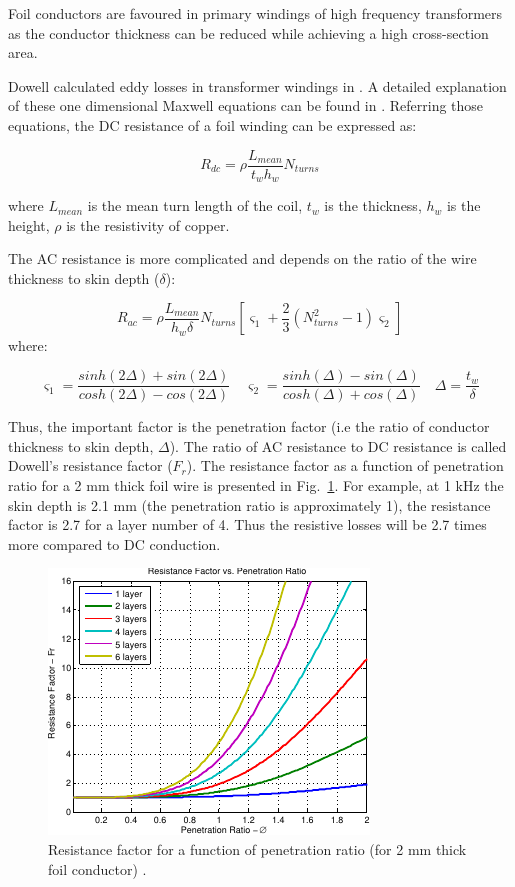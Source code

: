 \documentclass[a4paper, 11pt]{article} %
\begin{document}
Foil conductors are favoured in primary windings of high frequency transformers as the conductor thickness can be reduced while achieving a high cross-section area.

Dowell calculated eddy losses in transformer windings in \cite{Dowell1966}. A detailed explanation of these one dimensional Maxwell equations can be found in \cite{Villar2010}. Referring those equations, the DC resistance of a foil winding can be expressed as:

\begin{equation}
  R_{dc} = \rho \frac{L_{mean}}{t_w h_w} N_{turns}
\end{equation}

where $L_{mean}$ is the mean turn length of the coil, $t_w$ is the thickness, $h_w$ is the height, $\rho$ is the resistivity of copper.

The AC resistance is more complicated and depends on the ratio of the wire thickness to skin depth ($\delta$):

\begin{equation}
  R_{ac}=\rho \frac{L_{mean}}{h_w \delta} N_{turns} \left[\varsigma_1 + \frac{2}{3} (N_{turns}^2-1)\varsigma_2\right]
\end{equation}
where:

\begin{equation}
  \varsigma_1 = \dfrac{sinh(2\Delta)+sin(2\Delta)}{cosh(2\Delta)-cos(2\Delta)} \quad
  \varsigma_2 = \dfrac{sinh(\Delta)-sin(\Delta)}{cosh(\Delta)+cos(\Delta)} \quad  
  \Delta = \dfrac{t_w}{\delta}
\end{equation}

Thus, the important factor is the penetration factor (i.e the ratio of conductor thickness to skin depth, $\Delta$). The ratio of AC resistance to DC resistance is called Dowell's resistance factor ($F_r$). The resistance factor as a function of penetration ratio for a 2 mm thick foil wire is presented in Fig.~\ref{resistance_factor}. For example, at 1 kHz the skin depth is 2.1 mm (the penetration ratio is approximately 1), the resistance factor is 2.7 for a layer number of 4. Thus the resistive losses will be 2.7 times more compared to DC conduction.

\begin{figure}[]
  \centering
    \includegraphics[scale=1.25]{resistance_factor}
  \caption{Resistance factor for a function of penetration ratio (for 2 mm thick foil conductor) \cite{Villar2010}.}
  \label{resistance_factor}
\end{figure}
\end{document}
